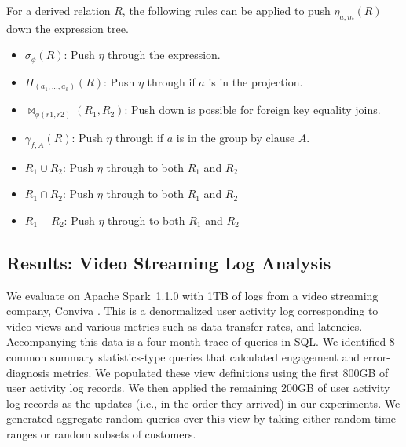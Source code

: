 \begin{definition}
For a derived relation $R$, the following rules can be applied to push $\eta_{a, m}(R)$ down the expression tree. 
\begin{itemize}[noitemsep]
\item $\sigma_{\phi}(R)$: Push $\eta$ through the expression.  
\item $\Pi_{(a_1,...,a_k)}(R)$: Push $\eta $ through if $a$ is in the projection.
\item $\bowtie_{\phi (r1,r2)}(R_1,R_2)$: Push down is possible for foreign key equality joins.
\item $\gamma_{f,A}(R)$: Push $\eta $ through if $a$ is in the group by clause $A$.
\item $R_1 \cup R_2$: Push $\eta $ through to both $R_1$ and $R_2$
\item $R_1 \cap R_2$: Push $\eta $ through to both $R_1$ and $R_2$
\item $R_1 - R_2$: Push $\eta $ through to both $R_1$ and $R_2$
\end{itemize}
\end{definition}

\subsection{Results: Video Streaming Log Analysis}
We evaluate \svc on Apache Spark~1.1.0 with 1TB of logs from a video streaming company, Conviva \cite{conviva}.
This is a denormalized user activity log corresponding to video views and various metrics such as data transfer rates, and latencies.
Accompanying this data is a four month trace of queries in SQL.
We identified 8 common summary statistics-type queries that calculated engagement and error-diagnosis metrics.
We populated these view definitions using the first 800GB of user activity log records.  
We then applied the remaining 200GB of user activity log records as the updates (i.e., in the order they arrived) in our experiments.
We generated aggregate random queries over this view by taking either random time ranges or random subsets of customers.

